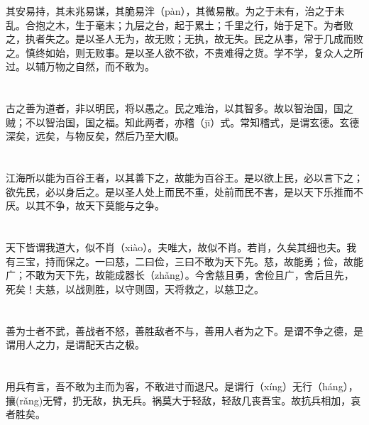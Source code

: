 \documentclass[a4paper,12pt,UTF8,twoside]{ctexbook}
\begin{document}
	其安易持，其未兆易谋，其脆易泮（pàn），其微易散。为之于未有，治之于未乱。合抱之木，生于毫末；九层之台，起于累土；千里之行，始于足下。为者败之，执者失之。是以圣人无为，故无败；无执，故无失。民之从事，常于几成而败之。慎终如始，则无败事。是以圣人欲不欲，不贵难得之货。学不学，复众人之所过。以辅万物之自然，而不敢为。
	
	\chapter{}	
	
	古之善为道者，非以明民，将以愚之。民之难治，以其智多。故以智治国，国之贼；不以智治国，国之福。知此两者，亦稽（jī）式。常知稽式，是谓玄德。玄德深矣，远矣，与物反矣，然后乃至大顺。
	
	\chapter{}	
	
	江海所以能为百谷王者，以其善下之，故能为百谷王。是以欲上民，必以言下之；欲先民，必以身后之。是以圣人处上而民不重，处前而民不害，是以天下乐推而不厌。以其不争，故天下莫能与之争。
	
	\chapter{}	
	
	天下皆谓我道大，似不肖（xiào）。夫唯大，故似不肖。若肖，久矣其细也夫。我有三宝，持而保之。一曰慈，二曰俭，三曰不敢为天下先。慈，故能勇；俭，故能广；不敢为天下先，故能成器长（zhǎng）。今舍慈且勇，舍俭且广，舍后且先，死矣！夫慈，以战则胜，以守则固，天将救之，以慈卫之。
	
	\chapter{}	
	
	善为士者不武，善战者不怒，善胜敌者不与，善用人者为之下。是谓不争之德，是谓用人之力，是谓配天古之极。
	
	\chapter{}	
	
	用兵有言，吾不敢为主而为客，不敢进寸而退尺。是谓行（xíng）无行（háng），攘(rǎng)无臂，扔无敌，执无兵。祸莫大于轻敌，轻敌几丧吾宝。故抗兵相加，哀者胜矣。
	
	\chapter{}	
	
\end{document}
